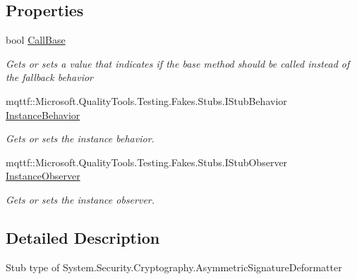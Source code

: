 \subsection*{Properties}
\begin{DoxyCompactItemize}
\item 
bool \hyperlink{class_system_1_1_security_1_1_cryptography_1_1_fakes_1_1_stub_asymmetric_signature_deformatter_a3f5f2b328050d1e948424f6ef15cdc9c}{Call\-Base}
\begin{DoxyCompactList}\small\item\em Gets or sets a value that indicates if the base method should be called instead of the fallback behavior\end{DoxyCompactList}\item 
mqttf\-::\-Microsoft.\-Quality\-Tools.\-Testing.\-Fakes.\-Stubs.\-I\-Stub\-Behavior \hyperlink{class_system_1_1_security_1_1_cryptography_1_1_fakes_1_1_stub_asymmetric_signature_deformatter_a2b1c4f81c790a4a74f2b05dca70a7e00}{Instance\-Behavior}
\begin{DoxyCompactList}\small\item\em Gets or sets the instance behavior.\end{DoxyCompactList}\item 
mqttf\-::\-Microsoft.\-Quality\-Tools.\-Testing.\-Fakes.\-Stubs.\-I\-Stub\-Observer \hyperlink{class_system_1_1_security_1_1_cryptography_1_1_fakes_1_1_stub_asymmetric_signature_deformatter_a556847b758ad0ce50f79942bb6dd6337}{Instance\-Observer}
\begin{DoxyCompactList}\small\item\em Gets or sets the instance observer.\end{DoxyCompactList}\end{DoxyCompactItemize}


\subsection{Detailed Description}
Stub type of System.\-Security.\-Cryptography.\-Asymmetric\-Signature\-Deformatter



